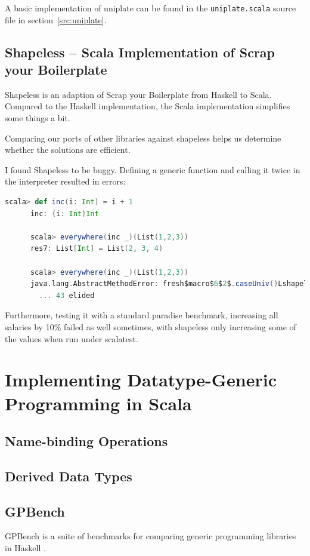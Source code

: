 \documentclass[abstracton,parskip=half]{scrreprt}
\newcommand{\cd}{\texttt}
\begin{document}
    A basic implementation of uniplate can be found in the \cd{uniplate.scala}
    source file in section~\ref{src:uniplate}.


    \section{Shapeless -- Scala Implementation of Scrap your Boilerplate}

    Shapeless is an adaption of Scrap your Boilerplate\cite{DBLP:conf/tldi/LammelJ03}
    from Haskell to Scala. Compared to the Haskell implementation, the Scala
    implementation simplifies some things a bit.

    Comparing our ports of other libraries against shapeless helps us determine
    whether the solutions are efficient.

    I found Shapeless to be buggy. Defining a generic function and calling
    it twice in the interpreter resulted in errors:
    \begin{lstlisting}[language=Scala,gobble=6]
      scala> def inc(i: Int) = i + 1
      inc: (i: Int)Int

      scala> everywhere(inc _)(List(1,2,3))
      res7: List[Int] = List(2, 3, 4)

      scala> everywhere(inc _)(List(1,2,3))
      java.lang.AbstractMethodError: fresh$macro$6$2$.caseUniv()Lshapeless/PolyDefns$Case;
        ... 43 elided
    \end{lstlisting}

    Furthermore, testing it with a standard paradise benchmark, increasing all
    salaries by 10\% failed as well sometimes, with shapeless only increasing
    some of the values when run under scalatest.

    \chapter{Implementing Datatype-Generic Programming in Scala}
    \section{Name-binding Operations}
    \section{Derived Data Types}
    \section{GPBench}
    GPBench is a suite of benchmarks for comparing generic programming
    libraries in Haskell \cite{DBLP:conf/haskell/RodriguezJJGKO08}.
\end{document}
